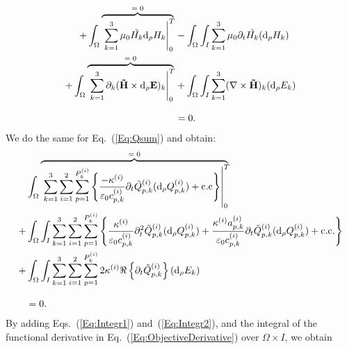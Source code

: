 \documentclass[aps,prl,notitlepage, superscriptaddress,longbibliography]{revtex4-1}
\begin{document}
\begin{equation}
\begin{split}
+\int_{\Omega}\rlap{$\overbrace{\phantom{\left.\sum_{k=1}^{3}\mu_0 \tilde{H_k} \mathrm{d}_{\rho}H_k\right|_0 ^T}}^{=\;0}$}\left.\sum_{k=1}^{3}\mu_0 \tilde{H_k} \mathrm{d}_{\rho}H_k\right|_0 ^T 
&- \int_{\Omega}\int_{I} \sum_{k=1}^{3} \mu_0 \partial_{t}\tilde{H_k} (\mathrm{d}_{\rho}H_k) \\
+\int_{\Omega}\rlap{$\overbrace{\phantom{\left.\sum_{k=1}^{3}\partial_{k}(\mathbf{\tilde{H}} \times \mathrm{d}_{\rho}\mathbf{E})_k\right|_0 ^T}}^{=\;0}$}\left.\sum_{k=1}^{3}\partial_{k}(\mathbf{\tilde{H}} \times \mathrm{d}_{\rho}\mathbf{E})_k\right|_0 ^T 
&+ \int_{\Omega}\int_{I} \sum_{k=1}^{3} (\nabla \times \mathbf{\tilde{H}})_{k}(\mathrm{d}_{\rho}E_k)\\[8pt]
&=0.
\end{split}
\end{equation}
We do the same  for Eq.~(\ref{Eq:Qsum}) and obtain:
\begin{equation} \label{Eq:Integr2}
\begin{split}
&\int_{\Omega}\rlap{$\overbrace{\phantom{\left.\sum_{k=1}^{3}\sum_{i=1}^{2}\sum_{p=1}^{P_{k}^{(i)}}\left(\frac{-\kappa^{(i)}}{\varepsilon_{0} c_{p, k}^{(i)}}\partial_{t}\tilde{Q}_{p, k}^{(i)}(\mathrm{d}_{\rho}Q_{p, k}^{(i)}) + \mathrm{c.c}\right)\right|_0 ^T}}^{=\;0}$}\left.\sum_{k=1}^{3}\sum_{i=1}^{2}\sum_{p=1}^{P_{k}^{(i)}}\left\{\frac{-\kappa^{(i)}}{\varepsilon_{0} c_{p, k}^{(i)}}\partial_{t}\tilde{Q}_{p, k}^{(i)}(\mathrm{d}_{\rho}Q_{p, k}^{(i)})+ \mathrm{c.c}\right\}\right|_0 ^T \\
+ &\int_{\Omega}\int_{I} \sum_{k=1}^{3} \sum_{i=1}^{2}\sum_{p=1}^{P_{k}^{(i)}}\left\{\frac{\kappa^{(i)}}{\varepsilon_{0} c_{p, k}^{(i)}}\partial^{2}_{t}\tilde{Q}_{p, k}^{(i)}(\mathrm{d}_{\rho}Q_{p, k}^{(i)}) + \frac{\kappa^{(i)} a_{p, k}^{(i)}}{\varepsilon_{0} c_{p, k}^{(i)}}\partial_{t}\tilde{Q}_{p, k}^{(i)} (\mathrm{d}_{\rho}Q_{p, k}^{(i)}) + \mathrm{c.c.}\right\}\\
+&\int_{\Omega}\int_{I} \sum_{k=1}^{3}\sum_{i=1}^{2}\sum_{p=1}^{P_{k}^{(i)}}2\kappa^{(i)}\Re\left\{\partial_{t}\tilde{Q}_{p, k}^{(i)}\right\} (\mathrm{d}_{\rho}E_{k})\\[8pt]
&=0.
\end{split}
\end{equation}
By adding Eqs.~(\ref{Eq:Integr1}) and~(\ref{Eq:Integr2}), and the integral of the functional derivative in Eq.~(\ref{Eq:ObjectiveDerivative}) over $\Omega \times I$, we obtain
\end{document}
